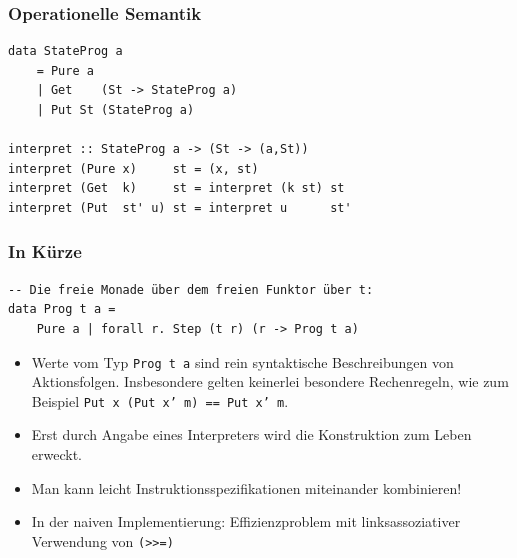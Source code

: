 \documentclass[12pt,compress,ngerman,utf8,t]{beamer}
\begin{document}
\begin{frame}[fragile]\frametitle{Operationelle Semantik}
  \begin{verbatim}
data StateProg a
    = Pure a
    | Get    (St -> StateProg a)
    | Put St (StateProg a)

interpret :: StateProg a -> (St -> (a,St))
interpret (Pure x)     st = (x, st)
interpret (Get  k)     st = interpret (k st) st
interpret (Put  st' u) st = interpret u      st'
  \end{verbatim}
\end{frame}

\begin{frame}[fragile]\frametitle{In Kürze}
  \begin{verbatim}
-- Die freie Monade über dem freien Funktor über t:
data Prog t a =
    Pure a | forall r. Step (t r) (r -> Prog t a)
  \end{verbatim}

  \begin{itemize}
    \item Werte vom Typ \texttt{Prog t a} sind rein syntaktische Beschreibungen
    von Aktionsfolgen.
    Insbesondere gelten keinerlei besondere Rechenregeln, wie zum
    Beispiel \texttt{Put x (Put x' m) == Put x' m}.
    \item Erst durch Angabe eines Interpreters wird die Konstruktion zum Leben
    erweckt.
    \item Man kann leicht Instruktionsspezifikationen miteinander kombinieren!
    \item In der naiven Implementierung: Effizienzproblem mit linksassoziativer
    Verwendung von \texttt{(>{}>=)}
  \end{itemize}
\end{frame}

\end{document}
